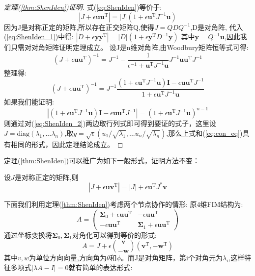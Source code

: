 \begin{proof}[定理(\ref{thm:ShenIden})证明]
式(\ref{eq:ShenIden})等价于:
\begin{equation}\label{eq:ShenIden_1}
|J+\epsilon \bm{u}\bm{u}^{\textrm{T}} |=|J|(1+\epsilon \bm{u}^{\textrm{T}} J^{-1}\bm{u})
\end{equation}
因为J是对称正定的矩阵,所以存在正交矩阵Q,使得$J=QDQ^{-1}$,D是对角阵,
代入(\ref{eq:ShenIden_1})中得:
$|D+\epsilon \bm{y}\bm{y}^{\textrm{T}} |=|D|(1+\epsilon \bm{y}^{\textrm{T}} D^{-1}\bm{y})$
其中$\bm{y}=Q^{-1}\bm{u}$,因此我们只需对对角矩阵证明定理成立。
设J是n维对角阵,由Woodbury矩阵恒等式可得:
\begin{equation}
(J+\epsilon \bm{u}\bm{u}^{\textrm{T}} )^{-1}=J^{-1}-\frac{1}{\epsilon^{-1}+\bm{u}^{\textrm{T}} J^{-1}\bm{u}}J^{-1}\bm{u}\bm{u}^{\textrm{T}} J^{-1}
\end{equation}
整理得:
\begin{equation}\label{eq:ShenIden_2}
(J+\epsilon \bm{u}\bm{u}^{\textrm{T}} )^{-1}=J^{-1}\frac{(1+\epsilon\bm{u}^{\textrm{T}} J^{-1}\bm{u})\bm{I}-\epsilon \bm{u}\bm{u}^{\textrm{T}} J^{-1}}{1+\epsilon\bm{u}^{\textrm{T}} J^{-1}\bm{u}}
\end{equation}
如果我们能证明:
\begin{equation}
|(1+\epsilon\bm{u}^{\textrm{T}} J^{-1}\bm{u})\bm{I}-\epsilon \bm{u}\bm{u}^{\textrm{T}} J^{-1}|=(1+\epsilon\bm{u}^{\textrm{T}} J^{-1}\bm{u})^{n-1}
\end{equation}
则通过对(\ref{eq:ShenIden_2})两边取行列式即可得到要证的式子，这里设$J=\text{diag}(\lambda_1,...\lambda_n)$,取$y=\sqrt{\epsilon}(u_1/\sqrt{\lambda_1},...u_n/\sqrt{\lambda_n})$,那么上式和(\ref{eq:con_eq})具有相同的形式，因此定理结论成立。
\end{proof}
定理(\ref{thm:ShenIden})可以推广为如下一般形式，证明方法不变：
\begin{corollary}设$J$是对称正定的矩阵,则
\begin{equation}
|J+\epsilon \bm{u}\bm{v}^{\textrm{T}} |=|J|+\epsilon \bm{u}^{\textrm{T}} J^*\bm{v}
\end{equation}
\end{corollary}
下面我们利用定理(\ref{thm:ShenIden})考虑两个节点协作的情形:
原4维FIM结构为:
\begin{equation}
A=\left(\begin{array}{cc}
\bm{\Sigma}_0+\epsilon \bm{u}\bm{u}^{\textrm{T}}  &-\epsilon \bm{u}\bm{u}^{\textrm{T}}  \\
-\epsilon \bm{u}\bm{u}^{\textrm{T}}  & \bm{\Sigma}_1+\epsilon \bm{u}\bm{u}^{\textrm{T}}
\end{array}
\right)
\end{equation}
通过坐标变换将$\bm{\Sigma}_0,\bm{\Sigma}_1$对角化可以得到等价的形式:
\begin{equation}
A=J+\epsilon\binom{\bm{v}}{-\bm{w}}(\bm{v}^{\textrm{T}} ,-\bm{w}^{\textrm{T}} )
\end{equation}
其中$v,w$为单位方向向量,方向角为$\theta$和$\phi$。而J是对角矩阵，第i个对角元为$\lambda_i$,这样特征多项式$|\lambda A-I|=0$就有简单的表达形式:

